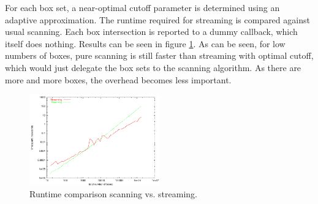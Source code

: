 For each box set, a near-optimal cutoff parameter is determined using
an adaptive approximation. The runtime required for streaming is
compared against usual scanning. Each box intersection is reported to
a dummy callback, which itself does nothing. Results can be seen in
figure \ref{fig_benchmark}. As can be seen, for low numbers of boxes,
pure scanning is still faster than streaming with optimal cutoff,
which would just delegate the box sets to the scanning algorithm. As
there are more and more boxes, the overhead becomes less important.

\begin{ccTexOnly}
 \begin{figure}
  \begin{center}
  \includegraphics[width=0.5\textwidth]{Box_intersection_d/fig/benchmark}
  \caption{Runtime comparison scanning vs. streaming.}
  \label{fig_benchmark}
  \end{center}
 \end{figure}
\end{ccTexOnly}



